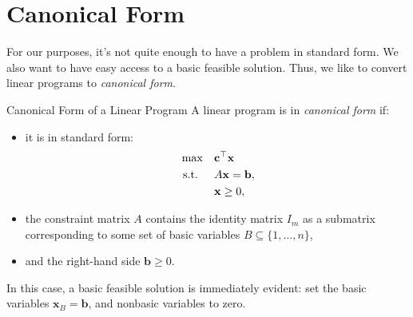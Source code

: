 \section{Canonical Form}
For our purposes, it's not quite enough to have a problem in standard form.  We also want to have easy access to a basic feasible solution.  Thus, we like to convert linear programs to \emph{canonical form}.

\begin{definition}{Canonical Form of a Linear Program}\label{def:canonical-form}
A linear program is in \emph{canonical form} if:
\begin{itemize}
    \item it is in standard form:
    \[
    \begin{aligned}
    \max \quad & \mathbf{c}^\top \mathbf{x} \\
    \mbox{ s.t. } \quad & A \mathbf{x} = \mathbf{b}, \\
    & \mathbf{x} \geq 0,
    \end{aligned}
    \]
    \item the constraint matrix \( A \) contains the identity matrix \( I_m \) as a submatrix corresponding to some set of basic variables \( B \subseteq \{1, \dots, n\} \),
    \item and the right-hand side \( \mathbf{b} \geq 0 \).
\end{itemize}
In this case, a basic feasible solution is immediately evident: set the basic variables \( \mathbf{x}_B = \mathbf{b} \), and nonbasic variables to zero.
\end{definition}

